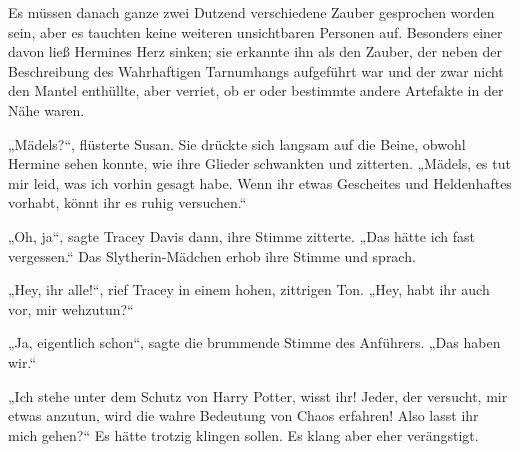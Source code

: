 Es müssen danach ganze zwei Dutzend verschiedene Zauber gesprochen worden sein, aber es tauchten keine weiteren unsichtbaren Personen auf. Besonders einer davon ließ Hermines Herz sinken; sie erkannte ihn als den Zauber, der neben der Beschreibung des Wahrhaftigen Tarnumhangs aufgeführt war und der zwar nicht den Mantel enthüllte, aber verriet, ob er oder bestimmte andere Artefakte in der Nähe waren.

„Mädels?“, flüsterte Susan. Sie drückte sich langsam auf die Beine, obwohl Hermine sehen konnte, wie ihre Glieder schwankten und zitterten. „Mädels, es tut mir leid, was ich vorhin gesagt habe. Wenn ihr etwas Gescheites und Heldenhaftes vorhabt, könnt ihr es ruhig versuchen.“

„Oh, ja“, sagte Tracey Davis dann, ihre Stimme zitterte. „Das hätte ich fast vergessen.“ Das Slytherin-Mädchen erhob ihre Stimme und sprach.

„Hey, ihr alle!“, rief Tracey in einem hohen, zittrigen Ton. „Hey, habt ihr auch vor, mir wehzutun?“

„Ja, eigentlich schon“, sagte die brummende Stimme des Anführers. „Das haben wir.“

„Ich stehe unter dem Schutz von Harry Potter, wisst ihr! Jeder, der versucht, mir etwas anzutun, wird die wahre Bedeutung von Chaos erfahren! Also lasst ihr mich gehen?“ Es hätte trotzig klingen sollen. Es klang aber eher verängstigt.

